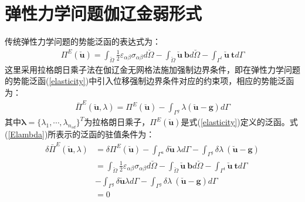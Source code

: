 \documentclass[engineeringmaster]{hquThesis}
\begin{document}
\section{弹性力学问题伽辽金弱形式}
传统弹性力学问题的势能泛函的表达式为：
\begin{equation}\label{elasticity}
\begin{split}
    \Pi^E(\breve{\pmb{u}})=\int_{\breve{\Omega}}\frac{1}{2}\varepsilon_{\alpha\beta}\sigma_{\alpha\beta}d\breve{\Omega}-\int_{\breve{\Omega}}\breve{\pmb{u}}~\pmb{b}d\breve{\Omega}-\int_{\Gamma^t}\breve{\pmb{u}}~\pmb{t}d\Gamma
\end{split}
\end{equation}
这里采用拉格朗日乘子法在伽辽金无网格法施加强制边界条件，即在弹性力学问题的势能泛函(\ref{elasticity})中引入位移强制边界条件对应的约束项，相应的势能泛函为：
\begin{equation}\label{Elambda}
\begin{split}
    \bar{\Pi}^E(\breve{\pmb{u}},\lambda)=\Pi^E(\breve{\pmb{u}})-\int_{\Gamma^g}\lambda(\breve{\pmb{u}}-\pmb{g})d\Gamma
\end{split}
\end{equation}
其中$\pmb{\lambda}=\{\lambda_1,\dotsb,\lambda_{n_{sd}}\}^T$为拉格朗日乘子，$\Pi^E(\breve{\pmb{u}})$是式(\ref{elasticity})定义的泛函。式(\ref{Elambda})所表示的泛函的驻值条件为：
\begin{equation}
\begin{split}
    \delta\bar{\Pi}^E(\breve{\pmb{u}},\lambda)&=\delta\Pi^E(\breve{\pmb{u}})-\int_{\Gamma^u}\delta\breve{\pmb{u}}~\lambda d\Gamma-\int_{\Gamma^g}\delta\lambda~(\breve{\pmb{u}}-\pmb{g})\\
    &=\int_{\breve{\Omega}}\frac{1}{2}\varepsilon_{\alpha\beta}\sigma_{\alpha\beta}d\breve{\Omega}-\int_{\breve{\Omega}}\breve{\pmb{u}}~\pmb{b}d\breve{\Omega}-\int_{\Gamma^t}\breve{\pmb{u}}~\pmb{t}d\Gamma\\
    &-\int_{\Gamma^g}\delta\breve{\pmb{u}}\lambda d\Gamma-\int_{\Gamma^g}\delta\lambda~(\breve{\pmb{u}}-\pmb{g})d\Gamma\\
    &=0
\end{split}
\end{equation}
\end{document}

